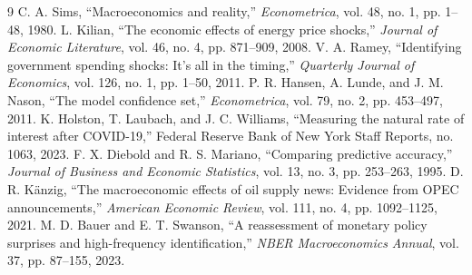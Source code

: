 \documentclass[conference]{IEEEtran}
\begin{document}
\begin{thebibliography}{9}
 C. A. Sims, ``Macroeconomics and reality,'' \emph{Econometrica}, vol. 48, no. 1, pp. 1--48, 1980.
 L. Kilian, ``The economic effects of energy price shocks,'' \emph{Journal of Economic Literature}, vol. 46, no. 4, pp. 871--909, 2008.
 V. A. Ramey, ``Identifying government spending shocks: It's all in the timing,'' \emph{Quarterly Journal of Economics}, vol. 126, no. 1, pp. 1--50, 2011.
 P. R. Hansen, A. Lunde, and J. M. Nason, ``The model confidence set,'' \emph{Econometrica}, vol. 79, no. 2, pp. 453--497, 2011.
 K. Holston, T. Laubach, and J. C. Williams, ``Measuring the natural rate of interest after COVID-19,'' Federal Reserve Bank of New York Staff Reports, no. 1063, 2023.
 F. X. Diebold and R. S. Mariano, ``Comparing predictive accuracy,'' \emph{Journal of Business and Economic Statistics}, vol. 13, no. 3, pp. 253--263, 1995.
 D. R. K\"anzig, ``The macroeconomic effects of oil supply news: Evidence from OPEC announcements,'' \emph{American Economic Review}, vol. 111, no. 4, pp. 1092--1125, 2021.
 M. D. Bauer and E. T. Swanson, ``A reassessment of monetary policy surprises and high-frequency identification,'' \emph{NBER Macroeconomics Annual}, vol. 37, pp. 87--155, 2023.
\end{thebibliography}
\end{document}
